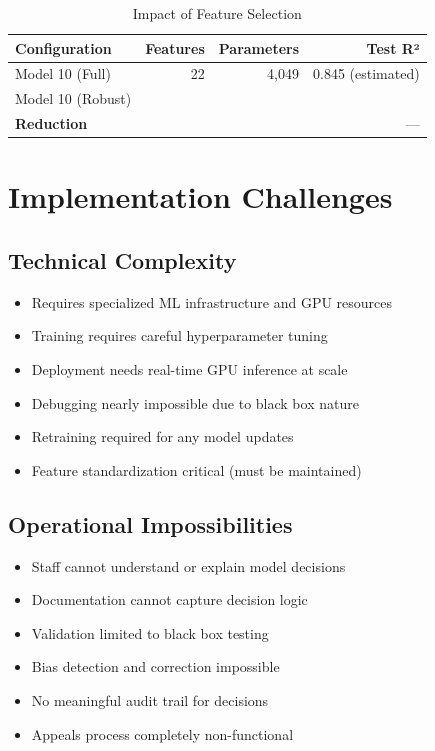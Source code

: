 \begin{table}[h]
\centering
\caption{Impact of Feature Selection}
\begin{tabular}{lrrr}
\toprule
\textbf{Configuration} & \textbf{Features} & \textbf{Parameters} & \textbf{Test R²} \\
\midrule
Model 10 (Full) & 22 & 4,049 & 0.845 (estimated) \\
Model 10 (Robust) & \ModelTenRobustFeatures{} & \ModelTenTotalParams{} & \ModelTenRSquaredTest{} \\
\midrule
\textbf{Reduction} & \ModelTenFeatureReduction{} & \ModelTenParameterReduction{} & --- \\
\bottomrule
\end{tabular}
\end{table}

\section{Implementation Challenges}

\subsection{Technical Complexity}

\begin{itemize}
    \item Requires specialized ML infrastructure and GPU resources
    \item Training requires careful hyperparameter tuning
    \item Deployment needs real-time GPU inference at scale
    \item Debugging nearly impossible due to black box nature
    \item Retraining required for any model updates
    \item Feature standardization critical (must be maintained)
\end{itemize}

\subsection{Operational Impossibilities}

\begin{itemize}
    \item Staff cannot understand or explain model decisions
    \item Documentation cannot capture decision logic
    \item Validation limited to black box testing
    \item Bias detection and correction impossible
    \item No meaningful audit trail for decisions
    \item Appeals process completely non-functional
\end{itemize}

